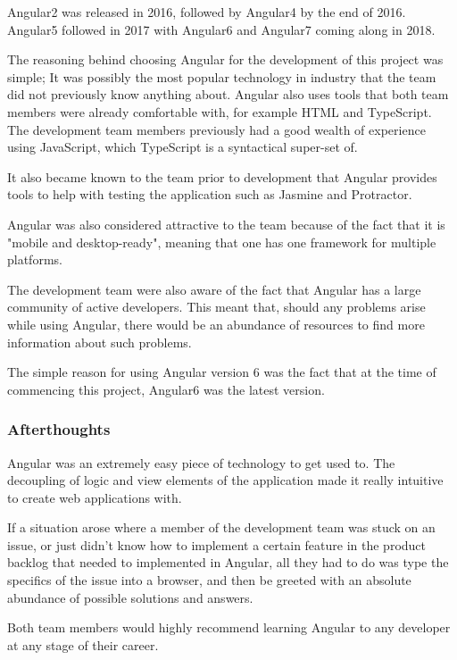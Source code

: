 \bigskip

Angular2 was released in 2016, followed by Angular4 by the end of 2016. Angular5 followed in 2017 with Angular6 and Angular7 coming along in 2018. 

\bigskip

The reasoning behind choosing Angular for the development of this project was simple; It was possibly the most popular technology in industry that the team did not previously know anything about. Angular also uses tools that both team members were already comfortable with, for example HTML and TypeScript. The development team members previously had a good wealth of experience using JavaScript, which TypeScript is a syntactical super-set of. 

It also became known to the team prior to development that Angular provides tools to help with testing the application such as Jasmine and Protractor. 

Angular was also considered attractive to the team because of the fact that it is "mobile and desktop-ready", meaning that one has one framework for multiple platforms. 

\bigskip

The development team were also aware of the fact that Angular has a large community of active developers. 
This meant that, should any problems arise while using Angular, there would be an abundance of resources to find more information about such problems. 

The simple reason for using Angular version 6 was the fact that at the time of commencing this project, Angular6 was the latest version.

\subsubsection{Afterthoughts}
Angular was an extremely easy piece of technology to get used to. The decoupling of logic and view elements of the application made it really intuitive to create web applications with. 

If a situation arose where a member of the development team was stuck on an issue, or just didn't know how to implement a certain feature in the product backlog that needed to implemented in Angular, all they had to do was type the specifics of the issue into a browser, and then be greeted with an absolute abundance of possible solutions and answers. 

Both team members would highly recommend learning Angular to any developer at any stage of their career.



